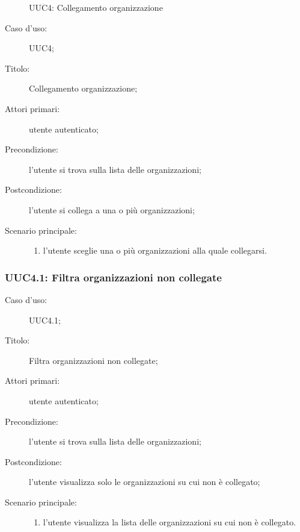 \documentclass[../../../analisi-dei-requisiti.tex]{subfiles}
\begin{document}
\begin{figure}[H]
  \centering
  \caption{UUC4: Collegamento organizzazione}%
  \label{fig:UUC4}
\end{figure}

\begin{description}
  \item[Caso d’uso:] UUC4;
  \item[Titolo:] Collegamento organizzazione;
  \item[Attori primari:] utente autenticato;
  \item[Precondizione:] l'utente si trova sulla lista delle organizzazioni;
  \item[Postcondizione:] l'utente si collega a una o più organizzazioni;
  \item[Scenario principale:]
        \begin{enumerate}
          \item l'utente sceglie una o più organizzazioni alla quale collegarsi.
        \end{enumerate}
\end{description}


\subsubsection{UUC4.1: Filtra organizzazioni non collegate}%
\begin{description}
  \item[Caso d’uso:] UUC4.1;
  \item[Titolo:] Filtra organizzazioni non collegate;
  \item[Attori primari:] utente autenticato;
  \item[Precondizione:] l'utente si trova sulla lista delle organizzazioni;
  \item[Postcondizione:] l'utente visualizza solo le organizzazioni su cui non è collegato;
  \item[Scenario principale:]
        \begin{enumerate}
          \item l'utente visualizza la lista delle organizzazioni su cui non è collegato.
        \end{enumerate}
\end{description}
\end{document}
